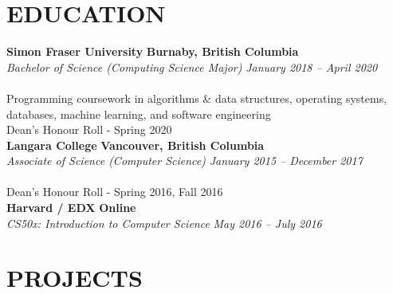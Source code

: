 \documentclass[margin,line]{resume}
\begin{document}
\begin{resume}
\sectionline

    \section{\mysidestyle \textbf{\large{E}\small{DUCATION}}}

    \textbf{\listing Simon Fraser University} \hfill \textbf{Burnaby, British Columbia} \vspace{1mm}\\
    \textsl{Bachelor of Science (Computing Science Major)} \hfill \textsl{January 2018 -- April 2020}\vspace{-3mm}\\\vspace{-1mm}\\
    Programming coursework in algorithms \& data structures, operating systems, databases, machine learning, and software engineering\\
    Dean’s Honour Roll - Spring 2020\\
    
    \textbf{\listing Langara College} \hfill \textbf{Vancouver, British Columbia} \vspace{1mm}\\
    \textsl{Associate of Science (Computer Science)} \hfill \textsl{January 2015 -- December 2017}\vspace{-3mm}\\\vspace{-1mm}\\
    Dean’s Honour Roll - Spring 2016, Fall 2016\\

    \textbf{\listing Harvard / EDX} \hfill \textbf{Online} \vspace{1mm}\\
    \textsl{CS50x: Introduction to Computer Science} \hfill \textsl{May 2016 -- July 2016}\vspace{-3mm}\\\vspace{-1mm}%

    \vspace{-1mm}

\sectionline

    \section{\mysidestyle \textbf{\large{P}\small{ROJECTS}}}
    

\end{resume}
\end{document}
